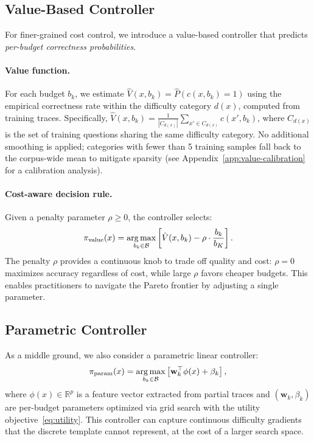 \subsection{Value-Based Controller}
\label{sec:method:value}

For finer-grained cost control, we introduce a value-based controller that predicts \emph{per-budget correctness probabilities}.

\paragraph{Value function.}
For each budget $b_k$, we estimate $\hat{V}(x, b_k) = \hat{P}(c(x, b_k) = 1)$ using the empirical correctness rate within the difficulty category $d(x)$, computed from training traces.
Specifically, $\hat{V}(x, b_k) = \frac{1}{|C_{d(x)}|}\sum_{x' \in C_{d(x)}} c(x', b_k)$, where $C_{d(x)}$ is the set of training questions sharing the same difficulty category.
No additional smoothing is applied; categories with fewer than 5 training samples fall back to the corpus-wide mean to mitigate sparsity (see Appendix~\ref{app:value-calibration} for a calibration analysis).

\paragraph{Cost-aware decision rule.}
Given a penalty parameter $\rho \geq 0$, the controller selects:
\begin{equation}
    \label{eq:value-decision}
    \pi_\text{value}(x) = \operatorname*{arg\,max}_{b_k \in \mathcal{B}} \left[ \hat{V}(x, b_k) - \rho \cdot \frac{b_k}{b_K} \right].
\end{equation}
The penalty $\rho$ provides a continuous knob to trade off quality and cost: $\rho = 0$ maximizes accuracy regardless of cost, while large $\rho$ favors cheaper budgets.
This enables practitioners to navigate the Pareto frontier by adjusting a single parameter.

\subsection{Parametric Controller}
\label{sec:method:parametric}

As a middle ground, we also consider a parametric linear controller:
\begin{equation}
    \pi_\text{param}(x) = \operatorname*{arg\,max}_{b_k \in \mathcal{B}} \left[ \mathbf{w}_k^\top \phi(x) + \beta_k \right],
\end{equation}
where $\phi(x) \in \mathbb{R}^p$ is a feature vector extracted from partial traces and $(\mathbf{w}_k, \beta_k)$ are per-budget parameters optimized via grid search with the utility objective~\eqref{eq:utility}.
This controller can capture continuous difficulty gradients that the discrete template cannot represent, at the cost of a larger search space.


